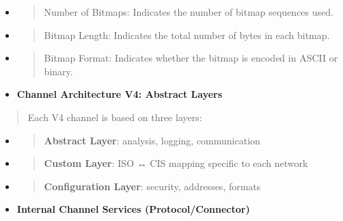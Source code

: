 \documentclass[12pt,a4paper]{report}
\begin{document}
\begin{itemize}
\item
  \begin{quote}
  Number of Bitmaps: Indicates the number of bitmap sequences used.
  \end{quote}
\item
  \begin{quote}
  Bitmap Length: Indicates the total number of bytes in each bitmap.
  \end{quote}
\item
  \begin{quote}
  Bitmap Format: Indicates whether the bitmap is encoded in ASCII or
  binary.
  \end{quote}
\end{itemize}

\begin{itemize}
\item
  \textbf{Channel Architecture V4: Abstract Layers}
\end{itemize}

\begin{quote}
Each V4 channel is based on three layers:
\end{quote}

\begin{itemize}
\item
  \begin{quote}
  \textbf{Abstract Layer}: analysis, logging, communication
  \end{quote}
\item
  \begin{quote}
  \textbf{Custom Layer}: ISO ↔ CIS mapping specific to each network
  \end{quote}
\item
  \begin{quote}
  \textbf{Configuration Layer}: security, addresses, formats
  \end{quote}
\end{itemize}

\begin{itemize}
\item
  \textbf{Internal Channel Services (Protocol/Connector)}
\end{itemize}
\clearpage
\end{document}
